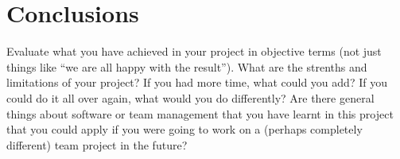 
\chapter{Conclusions}
\label{chap:conclusions}


Evaluate what you have achieved in your project in objective terms
(not just things like ``we are all happy with the result''). What
are the strenths and limitations of your project? If you had more
time, what could you add? If you could do it all over again, what
would you do differently? Are there general things about software or
team management that you have learnt in this project that you could
apply if you were going to work on a (perhaps completely different)
team project in the future?
